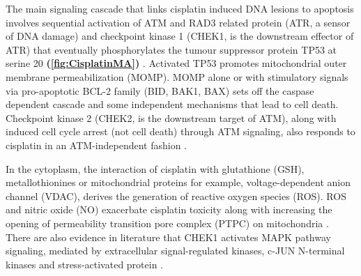 The main signaling cascade that links cisplatin induced DNA lesions to apoptosis involves sequential activation of ATM and RAD3 related protein (ATR, a sensor of DNA damage) and checkpoint kinase 1 (CHEK1, is the downstream effector of ATR) that  eventually phosphorylates the tumour suppressor protein TP53 at serine 20    \textbf{(\autoref{fig:CisplatinMA})} \cite{shieh2000human, cimprich2008atr}. Activated TP53 promotes mitochondrial outer membrane permeabilization (MOMP).  MOMP alone or with stimulatory signals via pro-apoptotic BCL-2 family (BID, BAK1, BAX) \cite {tajeddine2008hierarchical} sets off the caspase dependent cascade and some independent mechanisms that lead to cell death. Checkpoint kinase 2 (CHEK2, is the downstream target of ATM), along with induced cell cycle arrest  (not cell death) through ATM signaling, also responds to cisplatin in an ATM-independent fashion \cite{pabla2008atr}. 

In the cytoplasm, the interaction of cisplatin with glutathione (GSH), metallothionines or mitochondrial proteins for example, voltage-dependent anion channel (VDAC), derives the generation of reactive oxygen species (ROS). ROS and nitric oxide (NO) exacerbate cisplatin toxicity along with increasing the opening of permeability transition pore complex (PTPC) on mitochondria \cite{godoy2012endogenously}. There are also evidence in literature that CHEK1 activates MAPK pathway signaling, mediated by extracellular signal-regulated kinases, c-JUN N-terminal kinases and stress-activated protein \cite{persons2000effect, yeh2002increase}.

